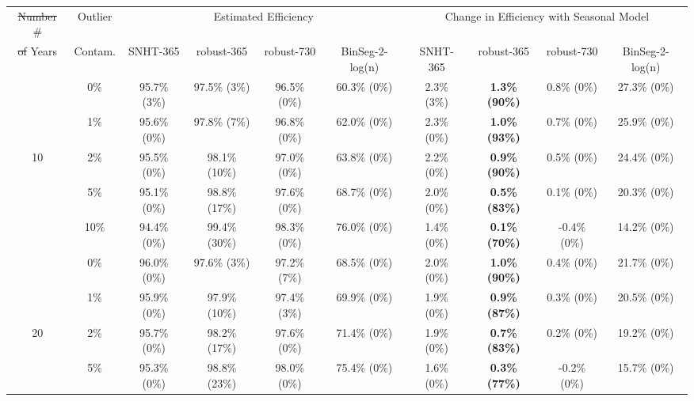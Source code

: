 \documentclass[12pt]{article}
\providecommand{\DIFaddtex}[1]{{\protect\color{blue}\uwave{#1}}} %
\providecommand{\DIFdeltex}[1]{{\protect\color{red}\sout{#1}}}                      %
\providecommand{\DIFaddbegin}{} %
\providecommand{\DIFaddend}{} %
\providecommand{\DIFaddFL}[1]{\DIFadd{#1}} %
\providecommand{\DIFdelFL}[1]{\DIFdel{#1}} %
\providecommand{\DIFaddbeginFL}{} %
\providecommand{\DIFaddendFL}{} %
\providecommand{\DIFdelbeginFL}{} %
\providecommand{\DIFdelendFL}{} %
\providecommand{\DIFadd}[1]{\texorpdfstring{\DIFaddtex{#1}}{#1}} %
\providecommand{\DIFdel}[1]{\texorpdfstring{\DIFdeltex{#1}}{}} %
\begin{document}
\begin{landscape}
\DIFaddbegin 

\DIFaddend \begin{table}[ht]
\DIFaddbeginFL \begin{footnotesize}
	\DIFaddendFL \centering
	\begin{tabular}{cc|cccc|cccc}
		\hline
		\DIFdelbeginFL \DIFdelFL{Number }\DIFdelendFL \DIFaddbeginFL \# \DIFaddFL{of }\DIFaddendFL & Outlier & \multicolumn{4}{c}{Estimated Efficiency} & \DIFdelbeginFL %
\DIFdelendFL \DIFaddbeginFL \multicolumn{4}{c}{Change in Efficiency with Seasonal Model} \DIFaddendFL \\ 
		\DIFdelbeginFL \DIFdelFL{of }\DIFdelendFL Years & Contam. & SNHT-365 & robust-365 & robust-730 & BinSeg-2-log(n) & SNHT-365 & robust-365 & robust-730 & BinSeg-2-log(n)\\ 
		\hline
		 & 0\% & 95.7\% (3\%) & 97.5\% (3\%) & 96.5\% (0\%) & 60.3\% (0\%) & 2.3\% (3\%) & \textbf{1.3\% (90\%)} & 0.8\% (0\%) & 27.3\% (0\%) \\ 
		 & 1\% & 95.6\% (0\%) & 97.8\% (7\%) & 96.8\% (0\%) & 62.0\% (0\%) & 2.3\% (0\%) & \textbf{1.0\% (93\%)} & 0.7\% (0\%) & 25.9\% (0\%) \\ 
		 10 & 2\% & 95.5\% (0\%) & 98.1\% (10\%) & 97.0\% (0\%) & 63.8\% (0\%) & 2.2\% (0\%) & \textbf{0.9\% (90\%)} & 0.5\% (0\%) & 24.4\% (0\%) \\ 
		 & 5\% & 95.1\% (0\%) & 98.8\% (17\%) & 97.6\% (0\%) & 68.7\% (0\%) & 2.0\% (0\%) & \textbf{0.5\% (83\%)} & 0.1\% (0\%) & 20.3\% (0\%) \\ 
		 & 10\% & 94.4\% (0\%) & 99.4\% (30\%) & 98.3\% (0\%) & 76.0\% (0\%) & 1.4\% (0\%) & \textbf{0.1\% (70\%)} & -0.4\% (0\%) & 14.2\% (0\%) \\ 
		 \DIFaddbeginFL \hline
		 \DIFaddendFL & 0\% & 96.0\% (0\%) & 97.6\% (3\%) & 97.2\% (7\%) & 68.5\% (0\%) & 2.0\% (0\%) & \textbf{1.0\% (90\%)} & 0.4\% (0\%) & 21.7\% (0\%) \\ 
		 & 1\% & 95.9\% (0\%) & 97.9\% (10\%) & 97.4\% (3\%) & 69.9\% (0\%) & 1.9\% (0\%) & \textbf{0.9\% (87\%)} & 0.3\% (0\%) & 20.5\% (0\%) \\ 
		 20 & 2\% & 95.7\% (0\%) & 98.2\% (17\%) & 97.6\% (0\%) & 71.4\% (0\%) & 1.9\% (0\%) & \textbf{0.7\% (83\%)} & 0.2\% (0\%) & 19.2\% (0\%) \\ 
		 & 5\% & 95.3\% (0\%) & 98.8\% (23\%) & 98.0\% (0\%) & 75.4\% (0\%) & 1.6\% (0\%) & \textbf{0.3\% (77\%)} & -0.2\% (0\%) & 15.7\% (0\%) \\ 

\end{tabular}
\end{footnotesize}
\end{table}
\end{landscape}
\end{document}
